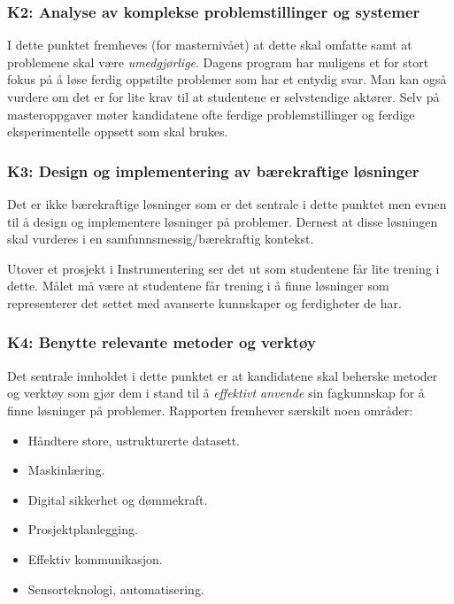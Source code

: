 \subsubsection{K2: Analyse av komplekse problemstillinger og systemer}

I dette punktet fremheves (for masternivået) at dette skal omfatte  samt at problemene skal være \emph{umedgjørlige}. Dagens program har muligens et for stort fokus på å løse ferdig oppstilte problemer som har et entydig svar. Man kan også vurdere om det er for lite krav til at studentene er selvstendige aktører. Selv på masteroppgaver møter kandidatene ofte ferdige problemstillinger og ferdige eksperimentelle oppsett som skal brukes.

\subsubsection{K3: Design og implementering av bærekraftige løsninger}

Det er ikke bærekraftige løsninger som er det sentrale i dette punktet men evnen til å design og implementere løsninger på problemer. Dernest at disse løsningen skal vurderes i en samfunnsmessig/bærekraftig kontekst.

Utover et prosjekt i Instrumentering ser det ut som studentene får lite trening i dette. Målet må være at studentene får trening i å finne løsninger som representerer det settet med avanserte kunnskaper og ferdigheter de har.

\subsubsection{K4: Benytte relevante metoder og verktøy}
Det sentrale innholdet i dette punktet er at kandidatene skal beherske metoder og verktøy som gjør dem i stand til å \emph{effektivt anvende} sin fagkunnskap for å finne løsninger på problemer. Rapporten fremhever særskilt noen områder:

\begin{itemize}
	\item Håndtere store, ustrukturerte datasett.
	\item Maskinlæring.
	\item Digital sikkerhet og dømmekraft.
	\item Prosjektplanlegging.
	\item Effektiv kommunikasjon.
	\item Sensorteknologi, automatisering.
\end{itemize}

